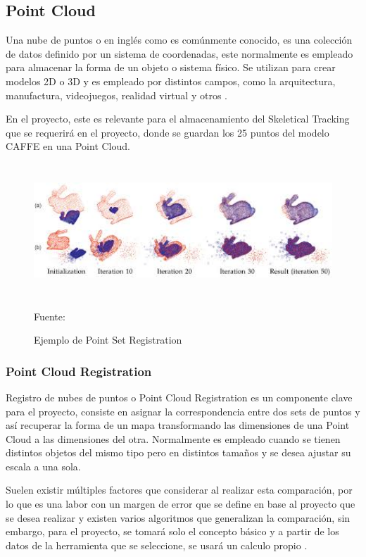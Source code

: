 \subsection{Point Cloud}

Una nube de puntos o en inglés como es comúnmente conocido, es una colección de datos definido por un sistema de coordenadas, este normalmente es empleado para almacenar la forma de un objeto o sistema físico. Se utilizan para crear modelos 2D o 3D y es empleado por distintos campos, como la arquitectura, manufactura, videojuegos, realidad virtual y otros \cite{pointcloud}.

En el proyecto, este es relevante para el almacenamiento del Skeletical Tracking que se requerirá en el proyecto, donde se guardan los 25 puntos del modelo CAFFE en una Point Cloud.

\begin{figure}[t!]
	\centering
	\includegraphics[width=15cm,height=5cm,]{./Images/driftexample.jpg}
	\caption{Ejemplo de Point Set Registration}
	\footnotesize Fuente: \cite{ravikumar2017generalised}
	\label{pointdriftexample}
\end{figure}

\subsubsection{Point Cloud Registration}

Registro de nubes de puntos o Point Cloud Registration es un componente clave para el proyecto, consiste en asignar la correspondencia entre dos sets de puntos y así recuperar la forma de un mapa transformando las dimensiones de una Point Cloud a las dimensiones del otra. Normalmente es empleado cuando se tienen distintos objetos del mismo tipo pero en distintos tamaños y se desea ajustar su escala a una sola.

Suelen existir múltiples factores que considerar al realizar esta comparación, por lo que es una labor con un margen de error que se define en base al proyecto que se desea realizar y existen varios algoritmos que generalizan la comparación, sin embargo, para el proyecto, se tomará solo el concepto básico y a partir de los datos de la herramienta que se seleccione, se usará un calculo propio \cite{myronenko2010point}.

